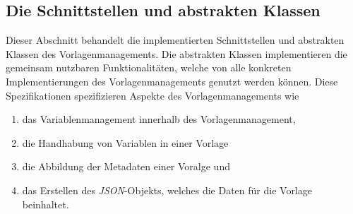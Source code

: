 \subsection{Die Schnittstellen und abstrakten Klassen}
Dieser Abschnitt behandelt die implementierten Schnittstellen und abstrakten Klassen des Vorlagenmanagements. Die abstrakten Klassen implementieren die gemeinsam nutzbaren Funktionalitäten, welche von alle konkreten Implementierungen des Vorlagenmanagements genutzt werden können. Diese Spezifikationen spezifizieren Aspekte des Vorlagenmanagements wie
\begin{enumerate}
	\item das Variablenmanagement innerhalb des Vorlagenmanagement,
	\item die Handhabung von Variablen in einer Vorlage 
	\item die Abbildung der Metadaten einer Voralge und 
	\item das Erstellen des \emph{JSON}-Objekts, welches die Daten für die Vorlage beinhaltet.
\end{enumerate}

